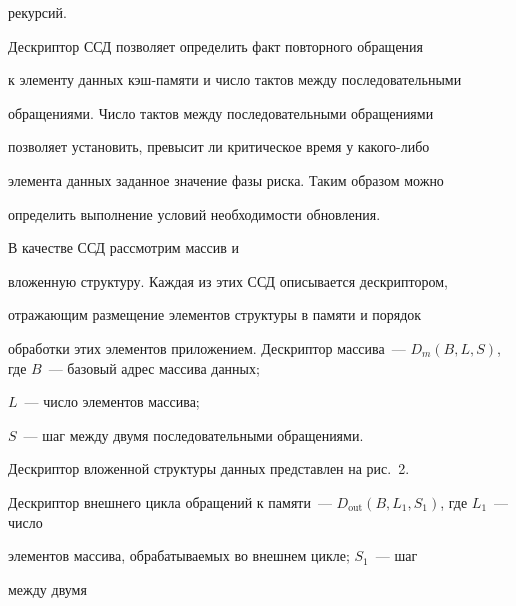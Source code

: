 рекурсий.

    

    Дескриптор ССД позволяет определить факт повторного обращения 

к элементу данных кэш-памяти и число тактов между последовательными 

обращениями. Число тактов между последовательными обращениями 

позволяет установить, превысит ли критическое время у какого-либо 

элемента данных заданное значение фазы риска. Таким образом можно 

определить выполнение условий необходимости обновления.

    

В качестве ССД рассмотрим массив и 

вложенную структуру. Каждая из этих ССД описывается дескриптором, 

отражающим размещение элементов структуры в памяти и порядок 

обработки этих элементов приложением. Дескриптор массива~--- $D_m(B, L, 

S)$, где $B$~--- базовый адрес массива данных;

    $L$~--- число элементов массива;

    $S$~--- шаг между двумя последовательными обращениями.

    

    Дескриптор вложенной структуры данных представлен на рис.~2. 

Дескриптор внешнего цикла обращений к памяти~--- $D_{\mathrm{out}}(B, L_1, 

S_1)$, где $L_1$~--- чис\-ло 

элементов массива, обрабатываемых во внешнем цикле; $S_1$~--- шаг 

между двумя\linebreak\vspace*{-12pt}



\pagebreak



\



\vspace*{-12pt}



